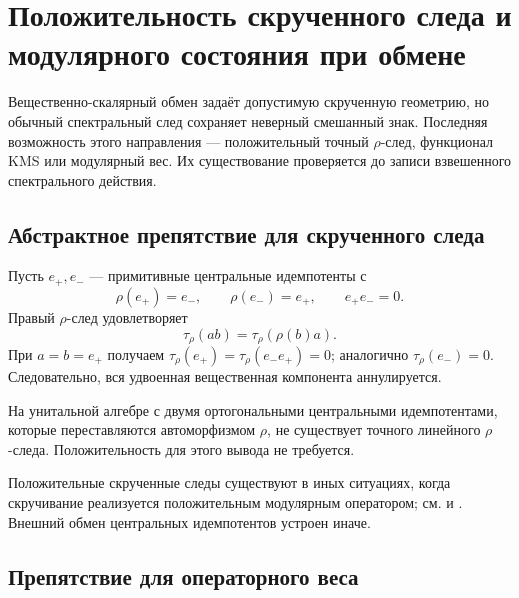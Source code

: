 \chapter{Положительность скрученного следа и модулярного состояния при обмене}

Вещественно-скалярный обмен задаёт допустимую скрученную геометрию, но
обычный спектральный след сохраняет неверный смешанный знак. Последняя
возможность этого направления --- положительный точный \(\rho\)-след,
функционал KMS или модулярный вес. Их существование проверяется до записи
взвешенного спектрального действия.

\section{Абстрактное препятствие для скрученного следа}

Пусть \(e_+,e_-\) --- примитивные центральные идемпотенты с
\begin{equation}
 \rho(e_+)=e_-,\qquad\rho(e_-)=e_+,\qquad e_+e_-=0.
\end{equation}
Правый \(\rho\)-след удовлетворяет
\begin{equation}
 \tau_\rho(ab)=\tau_\rho(\rho(b)a).
 \label{eq:v5-rho-trace-definition}
\end{equation}
При \(a=b=e_+\) получаем
\(\tau_\rho(e_+)=\tau_\rho(e_-e_+)=0\); аналогично
\(\tau_\rho(e_-)=0\). Следовательно, вся удвоенная вещественная компонента
аннулируется.

\begin{theorem}
На унитальной алгебре с двумя ортогональными центральными идемпотентами,
которые переставляются автоморфизмом \(\rho\), не существует точного
линейного \(\rho\)-следа. Положительность для этого вывода не требуется.
\end{theorem}

Положительные скрученные следы существуют в иных ситуациях, когда
скручивание реализуется положительным модулярным оператором; см.
 и . Внешний обмен центральных
идемпотентов устроен иначе.

\section{Препятствие для операторного веса}

